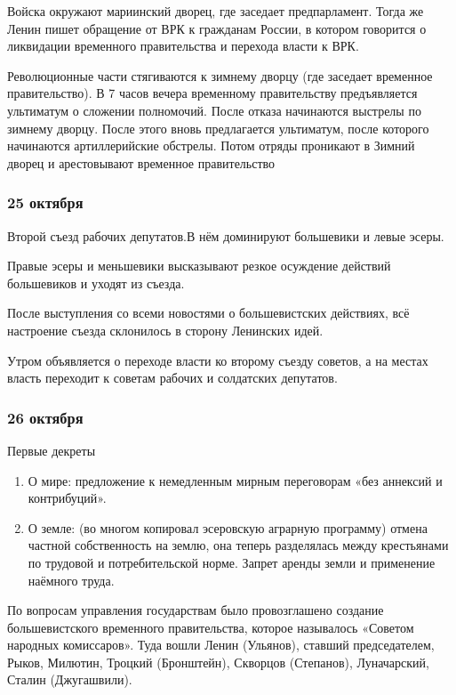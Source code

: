 Войска окружают мариинский дворец, где заседает предпарламент. Тогда же Ленин пишет обращение от ВРК к гражданам России, в котором говорится о ликвидации временного правительства и перехода власти к ВРК.

Революционные части стягиваются к зимнему дворцу (где заседает временное правительство). В 7 часов вечера временному правительству предъявляется ультиматум о сложении полномочий. После отказа начинаются выстрелы по зимнему дворцу. После этого вновь предлагается ультиматум, после которого начинаются артиллерийские обстрелы. Потом отряды проникают в Зимний дворец и арестовывают временное правительство

\subsubsection{\textbf{25 октября}}

Второй съезд рабочих депутатов.В нём доминируют большевики и левые эсеры.

Правые эсеры и меньшевики высказывают резкое осуждение действий большевиков и уходят из съезда.

После выступления со всеми новостями о большевистских действиях, всё настроение съезда склонилось в сторону Ленинских идей.

Утром объявляется о переходе власти ко второму съезду советов, а на местах власть переходит к советам рабочих и солдатских депутатов.

\subsubsection{\textbf{26 октября}}

Первые декреты

\begin{enumerate}
    \item О мире: предложение к немедленным мирным переговорам «без аннексий и контрибуций». 
    \item О земле: (во многом копировал эсеровскую аграрную программу) отмена частной собственность на землю, она теперь разделялась между крестьянами по трудовой и потребительской норме. Запрет аренды земли и применение наёмного труда.
\end{enumerate}

По вопросам управления государствам было провозглашено создание большевистского временного правительства, которое называлось «Советом народных комиссаров». Туда вошли Ленин (Ульянов), ставший председателем, Рыков, Милютин, Троцкий (Бронштейн), Скворцов (Степанов), Луначарский, Сталин (Джугашвили).

